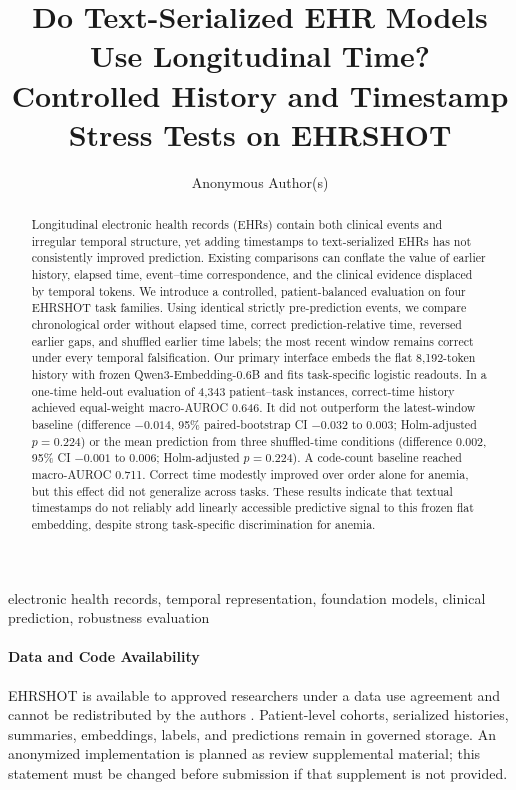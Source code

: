 \documentclass[pmlr,twocolumn,10pt]{jmlr}
\title[Longitudinal Time in Text-Serialized EHRs]{Do Text-Serialized EHR Models Use Longitudinal Time?\\
Controlled History and Timestamp Stress Tests on EHRSHOT}
\author{Anonymous Author(s)}
\begin{document}
\maketitle

\begin{center}
\end{center}

\begin{abstract}
Longitudinal electronic health records (EHRs) contain both clinical events and
irregular temporal structure, yet adding timestamps to text-serialized EHRs has
not consistently improved prediction. Existing comparisons can conflate the
value of earlier history, elapsed time, event--time correspondence, and the
clinical evidence displaced by temporal tokens. We introduce a controlled,
patient-balanced evaluation on four EHRSHOT task families. Using identical
strictly pre-prediction events, we compare chronological order without elapsed
time, correct prediction-relative time, reversed earlier gaps, and shuffled
earlier time labels; the most recent window remains correct under every temporal
falsification. Our primary interface embeds the flat 8,192-token history with
frozen Qwen3-Embedding-0.6B and fits task-specific logistic readouts. In a
one-time held-out evaluation of 4,343 patient--task instances, correct-time
history achieved equal-weight macro-AUROC 0.646. It did not outperform the
latest-window baseline (difference $-0.014$, 95\% paired-bootstrap CI $-0.032$
to $0.003$; Holm-adjusted $p=0.224$) or the mean prediction from three
shuffled-time conditions (difference $0.002$, 95\% CI $-0.001$ to $0.006$;
Holm-adjusted $p=0.224$). A code-count baseline reached macro-AUROC 0.711.
Correct time modestly improved over order alone for anemia, but this effect did
not generalize across tasks. These results indicate that textual timestamps do
not reliably add linearly accessible predictive signal to this frozen flat
embedding, despite strong task-specific discrimination for anemia.
\end{abstract}

\begin{keywords}
electronic health records, temporal representation, foundation models,
clinical prediction, robustness evaluation
\end{keywords}

\paragraph*{Data and Code Availability}
EHRSHOT is available to approved researchers under a data use agreement and
cannot be redistributed by the authors \citep{wornow2023ehrshot}. Patient-level
cohorts, serialized histories, summaries, embeddings, labels, and predictions
remain in governed storage. An anonymized implementation is planned as review
supplemental material; this statement must be changed before submission if that
supplement is not provided.
\end{document}
